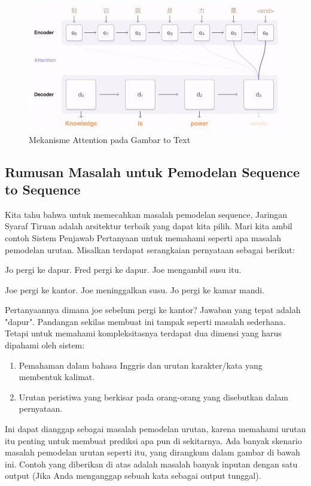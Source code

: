 \begin{figure}[H]
        \centerline{\includegraphics[scale=.5]{figures/gambar1}}
        \caption{Mekanisme Attention pada Gambar to Text}
		\label{attention}
\end{figure}


\subsection{Rumusan Masalah untuk Pemodelan Sequence to Sequence}
Kita tahu bahwa untuk memecahkan masalah pemodelan sequence, Jaringan Syaraf Tiruan adalah arsitektur terbaik yang dapat kita pilih. Mari kita ambil contoh Sistem Penjawab Pertanyaan untuk memahami seperti apa masalah pemodelan urutan. Misalkan terdapat serangkaian pernyataan sebagai berikut:

Jo pergi ke dapur. Fred pergi ke dapur. Joe mengambil susu itu.

Joe pergi ke kantor. Joe meninggalkan susu. Jo pergi ke kamar mandi.

Pertanyaannya dimana joe sebelum pergi ke kantor? Jawaban yang tepat adalah "dapur". Pandangan sekilas membuat ini tampak seperti masalah sederhana. Tetapi untuk memahami kompleksitasnya terdapat dua dimensi yang harus dipahami oleh sistem:

\begin{enumerate}
\item Pemahaman dalam bahasa Inggris dan urutan karakter/kata yang membentuk kalimat.
\item Urutan peristiwa yang berkisar pada orang-orang yang disebutkan dalam pernyataan.
\end{enumerate}
Ini dapat dianggap sebagai masalah pemodelan urutan, karena memahami urutan itu penting untuk membuat prediksi apa pun di sekitarnya. Ada banyak skenario masalah pemodelan urutan seperti itu, yang dirangkum dalam gambar di bawah ini. Contoh yang diberikan di atas adalah masalah banyak inputan dengan satu output (Jika Anda menganggap sebuah kata sebagai output tunggal).
